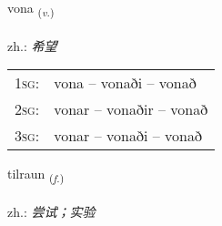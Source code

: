 \documentclass[frontgrid, backgrid]{flacards}\usepackage[]{graphicx}\usepackage[]{xcolor}
\begin{document}
\renewcommand{\flhead}{\vskip5pt \fboxsep=0pt {\small\bfseries\footnotesize Sagnorð | 动词}}
\renewcommand{\fcfoot}{\vskip5pt \fboxsep=0pt \hspace{2pt}{\small\bfseries\footnotesize 1K}}

\renewcommand{\blhead}{\vskip5pt {\small\bfseries\footnotesize Sagnorð | 动词 }}
\renewcommand{\bcfoot}{\vskip5pt \hspace{2pt}{\small\bfseries\footnotesize 1K}}


{vona \small{\textsubscript{(\textit{v.})}} \\[1ex] %
\textphonetic{[vɔːna]} \\
zh.: \emph{希望} \\  [2ex]
\renewcommand*{\arraystretch}{0.8}
\begin{tabular}{p{1cm}l}
\textsc{1sg}: & vona -- vonaði -- vonað \\ 
\textsc{2sg}: & vonar -- vonaðir -- vonað \\ 
\textsc{3sg}: & vonar -- vonaði -- vonað \\ 
\end{tabular}
}

\renewcommand{\flhead}{\vskip5pt \fboxsep=0pt {\small\bfseries\footnotesize Nafnorð | 名词}}
\renewcommand{\fcfoot}{\vskip5pt \fboxsep=0pt \hspace{2pt}{\small\bfseries\footnotesize 1K}}

\renewcommand{\blhead}{\vskip5pt {\small\bfseries\footnotesize Nafnorð | 名词 }}
\renewcommand{\bcfoot}{\vskip5pt \hspace{2pt}{\small\bfseries\footnotesize 1K}}


{tilraun \small{\textsubscript{(\textit{f.})}} \\[1ex] %
\textphonetic{[tʰɪlrœin]} \\
zh.: \emph{尝试；实验} \\  [2ex]
\renewcommand*{\arraystretch}{0.8}
}
\end{document}
